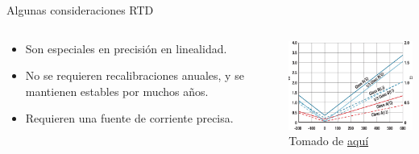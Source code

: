 \documentclass[aspectratio=169]{beamer}
\begin{document}
\begin{frame}{Algunas consideraciones RTD}
    \begin{columns}[c, onlytextwidth]
    \begin{column}{0.55\textwidth}
            \begin{itemize}
                \item Son especiales en precisión en linealidad.      
                \item No se requieren recalibraciones anuales, y se mantienen estables por muchos años. 
                \item Requieren una fuente de corriente precisa. 
            \end{itemize}
        \end{column}
        \begin{column}{0.45\textwidth}
        \includegraphics[width=6.5cm]{fig/RTD Curve.jpg}
            \\ \tiny{Tomado de \href{http://www.bearingsensor.com/bearing-rtd.html}{aquí}}
            
        \end{column}
        
    \end{columns}
\end{frame}

\end{document}
